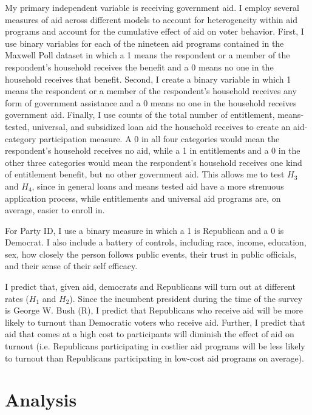 \documentclass[12pt]{paper}
\begin{document}
My primary independent variable is receiving government aid. I employ several measures of aid across different models to account for heterogeneity within aid programs and account for the cumulative effect of aid on voter behavior. First, I use binary variables for each of the nineteen aid programs contained in the Maxwell Poll dataset in which a 1 means the respondent or a member of the respondent’s household receives the benefit and a 0 means no one in the household receives that benefit. Second, I create a binary variable in which 1 means the respondent or a member of the respondent’s household receives any form of government assistance and a 0 means no one in the household receives government aid. Finally, I use counts of the total number of entitlement, means-tested, universal, and subsidized loan aid the household receives to create an aid-category participation measure. A 0 in all four categories would mean the respondent’s household receives no aid, while a 1 in entitlements and a 0 in the other three categories would mean the respondent’s household receives one kind of entitlement benefit, but no other government aid. This allows me to test $H_3$ and $H_4$, since in general loans and means tested aid have a more strenuous application process, while entitlements and universal aid programs are, on average, easier to enroll in.

For Party ID, I use a binary measure in which a 1 is Republican and a 0 is Democrat. I also include a battery of controls, including race, income, education, sex, how closely the person follows public events, their trust in public officials, and their sense of their self efficacy.

I predict that, given aid, democrats and Republicans will turn out at different rates ($H_1$ and $H_2$). Since the incumbent president during the time of the survey is George W. Bush (R), I predict that Republicans who receive aid will be more likely to turnout than Democratic voters who receive aid. Further, I predict that aid that comes at a high cost to participants will diminish the effect of aid on turnout (i.e. Republicans participating in costlier aid programs will be less likely to turnout than Republicans participating in low-cost aid programs on average).

\section{Analysis}
\end{document}
